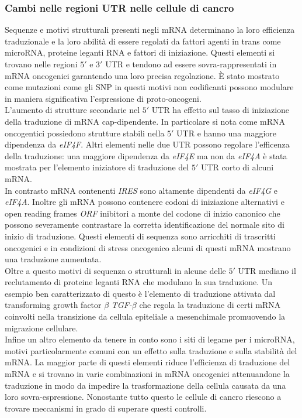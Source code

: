 		\subsubsection{Cambi nelle regioni UTR nelle cellule di cancro}
		\label{subsubsec:53UTRcomp}
		Sequenze e motivi strutturali presenti negli mRNA determinano la loro efficienza traduzionale e la loro abilit\`a di essere regolati da fattori agenti in trans come microRNA, proteine leganti RNA e fattori di iniziazione.
		Questi elementi si trovano nelle regioni $5'$ e $3'$ UTR e tendono ad essere sovra-rappresentati in mRNA oncogenici garantendo una loro precisa regolazione.
		\`E stato mostrato come mutazioni come gli SNP in questi motivi non codificanti possono modulare in maniera significativa l'espressione di proto-oncogeni.\\
		L'aumento di strutture secondarie nel $5'$ UTR ha effetto sul tasso di iniziazione della traduzione di mRNA cap-dipendente.
		In particolare si nota come mRNA oncogentici possiedono strutture stabili nella $5'$ UTR e hanno una maggiore dipendenza da \emph{eIF4F}.
		Altri elementi nelle due UTR possono regolare l'efficenza della traduzione: una maggiore dipendenza da \emph{eIF4E} ma non da \emph{eIF4A} \`e stata mostrata per l'elemento iniziatore di traduzione del $5'$ UTR corto di alcuni mRNA.\\
		In contrasto mRNA contenenti \emph{IRES} sono altamente dipendenti da \emph{eIF4G} e \emph{eIF4A}.
		Inoltre gli mRNA possono contenere codoni di iniziazione alternativi e open reading frames \emph{ORF} inibitori a monte del codone di inizio canonico che possono severamente contrastare la corretta identificazione del normale sito di inizio di traduzione.
		Questi elementi di sequenza sono arricchiti di trascritti oncogenici e in condizioni di stress oncogenico alcuni di questi mRNA mostrano una traduzione aumentata.\\
		Oltre a questo motivi di sequenza o strutturali in alcune delle $5'$ UTR mediano il reclutamento di proteine leganti RNA che modulano la sua traduzione.
		Un esempio ben caratterizzato di questo \`e l'elemento di traduzione attivata dal transforming growth factor $\beta$ \emph{TGF-$\beta$} che regola la traduzione di certi mRNA coinvolti nella transizione da cellula epiteliale a mesenchimale promuovendo la migrazione cellulare.\\
		Infine un altro elemento da tenere in conto sono i siti di legame per i microRNA, motivi particolarmente comuni con un effetto sulla traduzione e sulla stabilit\`a del mRNA.
		La maggior parte di questi elementi riduce l'efficienza di traduzione del mRNA e si trovano in varie combinazioni in mRNA oncogenici attenuandone la traduzione in modo da impedire la trasformazione della cellula causata da una loro sovra-espressione.
		Nonostante tutto questo le cellule di cancro riescono a trovare meccanismi in grado di superare questi controlli.\\


